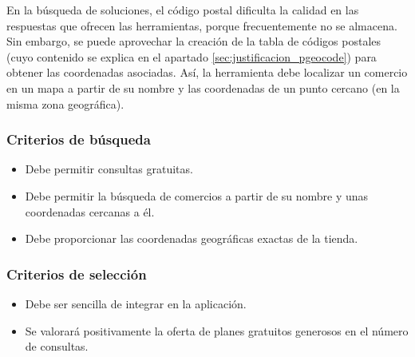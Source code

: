 En la búsqueda de soluciones, el código postal dificulta la calidad en las respuestas que ofrecen las herramientas, porque frecuentemente no se almacena. Sin embargo, se puede aprovechar la creación de la tabla de códigos postales (cuyo contenido se explica en el apartado \ref{sec:justificacion_pgeocode}) para obtener las coordenadas asociadas. Así, la herramienta debe localizar un comercio en un mapa a partir de su nombre y las coordenadas de un punto cercano (en la misma zona geográfica).

\subsubsection{Criterios de búsqueda}
\begin{itemize}
    \item Debe permitir consultas gratuitas.
    \item Debe permitir la búsqueda de comercios a partir de su nombre y unas coordenadas cercanas a él.
    \item Debe proporcionar las coordenadas geográficas exactas de la tienda.
\end{itemize}

\subsubsection{Criterios de selección}
\begin{itemize}
    \item Debe ser sencilla de integrar en la aplicación.
    \item Se valorará positivamente la oferta de planes gratuitos generosos en el número de consultas.
\end{itemize}

